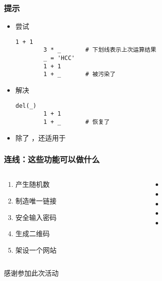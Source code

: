 \begin{CJK}{UTF8}{gbsn}
\begin{frame} [fragile]
	\frametitle{提示}
	\begin{itemize}
	\item 尝试
		\begin{lstlisting}[style=pythonstyle, gobble=8, texcl, escapechar=@]
		1 + 1
		3 * _		# 下划线表示上次运算结果
		_ = 'HCC'
		1 + 1
		1 + _		# 被污染了
		\end{lstlisting}
	\item 解决
		\begin{lstlisting}[style=pythonstyle, gobble=8, texcl, escapechar=@]
		del(_)
		1 + 1
		1 + _		# 恢复了
		\end{lstlisting}
	\item 除了 \inlinePython{_} ，还适用于
	\end{itemize}
\end{frame}

\begin{frame} [fragile]
	\frametitle{连线：这些功能可以做什么}
	\linespread{1.5}
	\begin{columns}[T]
		\begin{column}[T]{.5\textwidth}
			\begin{enumerate}
			\item 产生随机数
			\item 制造唯一链接
			\item 安全输入密码
			\item 生成二维码
			\item 架设一个网站
			\end{enumerate}
		\end{column}
		\begin{column}[T]{.5\textwidth}
			\begin{itemize}
			\item {}
			\item {}
			\item {}
			\item {}
			\item {}
			\end{itemize}
		\end{column}
	\end{columns}
\end{frame}

\PreLastFrame
\begin{frame}
	\centerline{\fontsize{32}{32}\selectfont 感谢参加此次活动}
\end{frame}

\newpage
\end{CJK}


